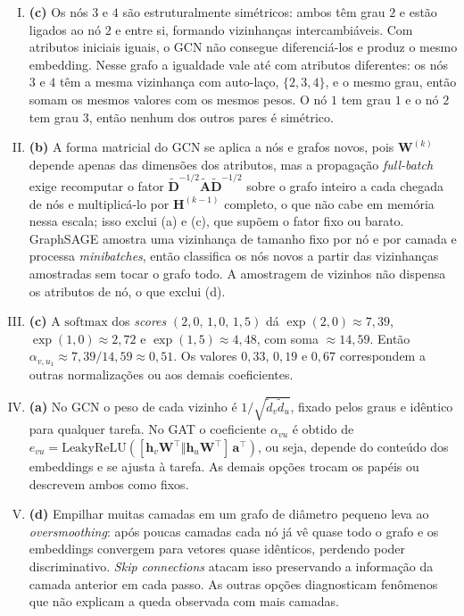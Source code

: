 \documentclass{dlproblemset}
\begin{document}
\begin{enumerate}[I)]
    \item \textbf{(c)} Os nós $3$ e $4$ são estruturalmente simétricos: ambos têm grau $2$ e estão ligados ao nó $2$ e entre si, formando vizinhanças intercambiáveis. Com atributos iniciais iguais, o GCN não consegue diferenciá-los e produz o mesmo embedding. Nesse grafo a igualdade vale até com atributos diferentes: os nós $3$ e $4$ têm a mesma vizinhança com auto-laço, $\{2,3,4\}$, e o mesmo grau, então somam os mesmos valores com os mesmos pesos. O nó $1$ tem grau $1$ e o nó $2$ tem grau $3$, então nenhum dos outros pares é simétrico.

    \item \textbf{(b)} A forma matricial do GCN se aplica a nós e grafos novos, pois $\mathbf{W}^{(k)}$ depende apenas das dimensões dos atributos, mas a propagação \textit{full-batch} exige recomputar o fator $\tilde{\mathbf{D}}^{-1/2} \tilde{\mathbf{A}} \tilde{\mathbf{D}}^{-1/2}$ sobre o grafo inteiro a cada chegada de nós e multiplicá-lo por $\mathbf{H}^{(k-1)}$ completo, o que não cabe em memória nessa escala; isso exclui (a) e (c), que supõem o fator fixo ou barato. GraphSAGE amostra uma vizinhança de tamanho fixo por nó e por camada e processa \textit{minibatches}, então classifica os nós novos a partir das vizinhanças amostradas sem tocar o grafo todo. A amostragem de vizinhos não dispensa os atributos de nó, o que exclui (d).

    \item \textbf{(c)} A $\mathrm{softmax}$ dos \textit{scores} $(2{,}0,\, 1{,}0,\, 1{,}5)$ dá $\exp(2{,}0) \approx 7{,}39$, $\exp(1{,}0) \approx 2{,}72$ e $\exp(1{,}5) \approx 4{,}48$, com soma $\approx 14{,}59$. Então $\alpha_{v,u_1} \approx 7{,}39/14{,}59 \approx 0{,}51$. Os valores $0{,}33$, $0{,}19$ e $0{,}67$ correspondem a outras normalizações ou aos demais coeficientes.

    \item \textbf{(a)} No GCN o peso de cada vizinho é $1/\sqrt{\tilde d_v \tilde d_u}$, fixado pelos graus e idêntico para qualquer tarefa. No GAT o coeficiente $\alpha_{vu}$ é obtido de $e_{vu} = \mathrm{LeakyReLU}([\mathbf{h}_v \mathbf{W}^{\top} \Vert \mathbf{h}_u \mathbf{W}^{\top}]\, \mathbf{a}^{\top})$, ou seja, depende do conteúdo dos embeddings e se ajusta à tarefa. As demais opções trocam os papéis ou descrevem ambos como fixos.

    \item \textbf{(d)} Empilhar muitas camadas em um grafo de diâmetro pequeno leva ao \textit{oversmoothing}: após poucas camadas cada nó já vê quase todo o grafo e os embeddings convergem para vetores quase idênticos, perdendo poder discriminativo. \textit{Skip connections} atacam isso preservando a informação da camada anterior em cada passo. As outras opções diagnosticam fenômenos que não explicam a queda observada com mais camadas.


\end{enumerate}
\end{document}
